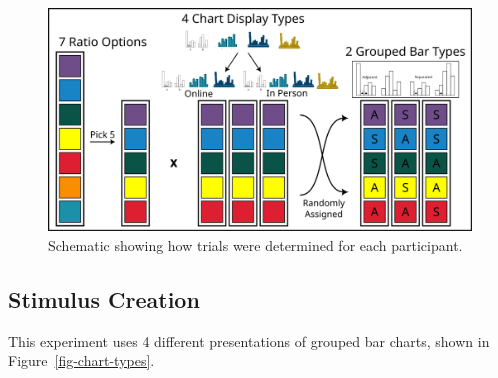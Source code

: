 \documentclass[runningheads
]{llncs}
\begin{document}
\begin{figure}

{\centering \includegraphics{image/design.png}

}

\caption{\label{fig-design}Schematic showing how trials were determined
for each participant.}

\end{figure}

\hypertarget{stimulus-creation}{%
\subsection{Stimulus Creation}\label{stimulus-creation}}

This experiment uses 4 different presentations of grouped bar charts,
shown in Figure~\ref{fig-chart-types}.
\end{document}
